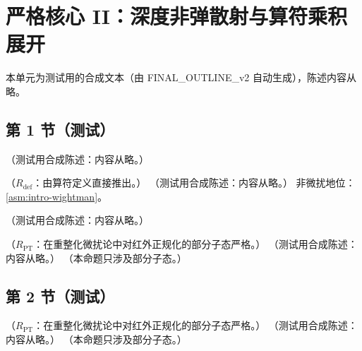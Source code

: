 \chapter{严格核心 II：深度非弹散射与算符乘积展开}\label{ch:dis}
本单元为测试用的合成文本（由 FINAL\_OUTLINE\_v2 自动生成），陈述内容从略。

\section{第 1 节（测试）}\label{sec:dis-kinematics}

\begin{definition}\label{def:dis-kinematics}
（测试用合成陈述：内容从略。）
\end{definition}

\begin{proposition}\label{prop:dis-W-structure}
（$R_{\mathrm{def}}$：由算符定义直接推出。）
（测试用合成陈述：内容从略。）
非微扰地位：\cref{asm:intro-wightman}。
\end{proposition}

\begin{definition}[前向 Compton 振幅]\label{def:dis-compton}
（测试用合成陈述：内容从略。）
\end{definition}

\begin{proposition}\label{prop:dis-compton-analytic}
（$R_{\mathrm{PT}}$：在重整化微扰论中对红外正规化的部分子态严格。）
（测试用合成陈述：内容从略。）
（本命题只涉及部分子态。）
\end{proposition}

\section{第 2 节（测试）}\label{sec:dis-compton}

\begin{proposition}[色散关系：Taylor 系数 = 矩（部分子靶） \tagR]\label{prop:dis-dispersion}
（$R_{\mathrm{PT}}$：在重整化微扰论中对红外正规化的部分子态严格。）
（测试用合成陈述：内容从略。）
（本命题只涉及部分子态。）
\end{proposition}

